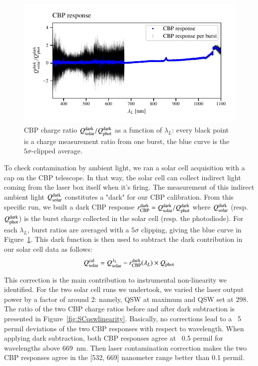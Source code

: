 \begin{figure}[h]
    \centering
    \includegraphics[width=\columnwidth]{fig/sc_dark_qswMAX.pdf}
    \caption{CBP charge ratio $Q_{\mathrm{solar}}^{\rm dark}/Q_{\mathrm{phot}}^{\rm dark}$ as a function of $\lambda_L$: every black point is a charge measurement ratio from one burst, the blue curve is the $5\sigma$-clipped average.}
    \label{fig:sc_dark}
\end{figure}

To check contamination by ambient light, we ran a solar cell acquisition with a cap on the CBP telescope. In that way, the solar cell can collect indirect light coming from the laser box itself when it's firing. The measurement of this indirect ambient light $Q_{\mathrm{solar}}^{\rm dark}$ constitutes a "dark" for our CBP calibration. From this specific run, we built a dark CBP response $r_{\mathrm{CBP}}^{\rm dark} = Q_{\mathrm{solar}}^{\rm dark} / Q_{\mathrm{phot}}^{\rm dark}$ where $Q_{\mathrm{solar}}^{\rm dark}$ (resp. $Q_{\mathrm{phot}}^{\rm dark}$) is the burst charge collected in the solar cell (resp. the photodiode). For each $\lambda_L$, burst ratios are averaged with a $5\sigma$ clipping, giving the blue curve in Figure~\ref{fig:sc_dark}. This dark function is then used to subtract the dark contribution in our solar cell data as follows:
\begin{equation}
    Q_{\mathrm{solar}}^{\rm cal} = Q_{\mathrm{solar}}^{\lambda_L} - r_{\mathrm{CBP}}^{\rm dark}(\lambda_L) \times Q_{\mathrm{phot}} \end{equation}

This correction is the main contribution to instrumental non-linearity we identified. For the two solar cell runs we undertook, we varied the laser output power by a factor of around 2: namely, QSW at maximum and QSW set at 298. The ratio of the two CBP charge ratios before and after dark subtraction is presented in Figure~\ref{fig:SCqswlinearity}. Basically, no corrections lead to a ~5 permil deviations of the two CBP responses with respect to wavelength. When applying dark subtraction, both CBP responses agree at ~0.5 permil for wavelengths above \SI{669}{\nm}. Then laser contamination correction makes the two CBP responses agree in the [532, 669] nanometer range better than 0.1 permil. 


